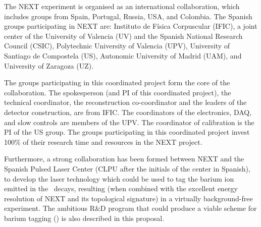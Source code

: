 The NEXT experiment is organised as an international collaboration, which includes groups from Spain, Portugal, Russia, USA, and Colombia. The Spanish groups participating in NEXT are: Instituto de Física Corpuscular (IFIC), a joint center of the University of Valencia (UV) and the Spanish National Research Council (CSIC), Polytechnic University of Valencia (UPV), University of Santiago de Compostela (US), Autonomic University of Madrid (UAM), and University of Zaragoza (UZ). 

The groups participating in this coordinated project form the core of the collaboration. The spokesperson (and PI of this coordinated project), the technical coordinator, the reconstruction co-coordinator and the leaders of the detector construction, are from IFIC. The coordinators of the electronics, DAQ, and slow controls are members of the UPV. The coordinator of calibration is the PI  of the US group. The groups participating in this coordinated project invest 100\% of their research time and resources in the NEXT project. 

Furthermore, a strong collaboration has been  formed between NEXT and the Spanish Pulsed Laser Center (CLPU after the initials of the center in Spanish), to develop the laser technology which could be used to tag the barium ion emitted in the \bb\ decays, resulting (when combined with the excellent energy resolution of NEXT and its topological signature) in a virtually background-free experiment. The ambitious R\&D program that could produce a viable scheme for barium tagging (\BATA) is also described in this proposal.  

%


